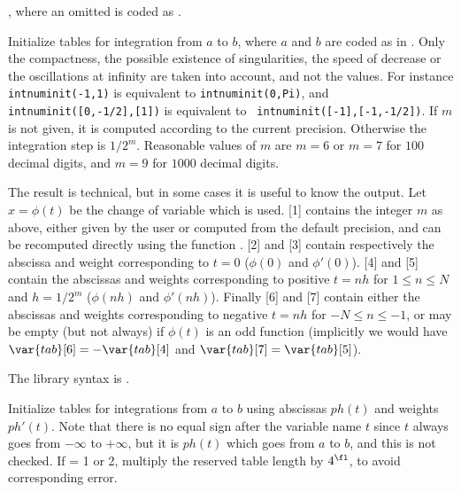 ,
where an omitted  is coded as .

\label{se:intnuminit}
Initialize tables for integration from
$a$ to $b$, where $a$ and $b$ are coded as in . Only the
compactness, the possible existence of singularities, the speed of decrease
or the oscillations at infinity are taken into account, and not the values.
For instance {\tt intnuminit(-1,1)} is equivalent to {\tt intnuminit(0,Pi)},
and {\tt intnuminit([0,-1/2],[1])} is equivalent to {\tt
intnuminit([-1],[-1,-1/2])}. If $m$ is not given, it is computed according to
the current precision. Otherwise the integration step is $1/2^m$. Reasonable
values of $m$ are $m=6$ or $m=7$ for $100$ decimal digits, and $m=9$ for
$1000$ decimal digits.

The result is technical, but in some cases it is useful to know the output.
Let $x=\phi(t)$ be the change of variable which is used. [1] contains
the integer $m$ as above, either given by the user or computed from the default
precision, and can be recomputed directly using the function .
[2] and [3] contain respectively the abscissa and weight
corresponding to $t=0$ ($\phi(0)$ and $\phi'(0)$). [4] and
[5] contain the abscissas and weights corresponding to positive
$t=nh$ for $1\le n\le N$ and $h=1/2^m$ ($\phi(nh)$ and $\phi'(nh)$). Finally
[6] and [7] contain either the abscissas and weights
corresponding to negative $t=nh$ for $-N\le n\le -1$, or may be empty (but
not always) if $\phi(t)$ is an odd function (implicitly we would have
$\var{tab}[6]=-\var{tab}[4]$ and $\var{tab}[7]=\var{tab}[5]$).

The library syntax is .

\label{se:intnuminitgen}
Initialize tables for integrations from $a$ to $b$ using abscissas
$ph(t)$ and weights $ph'(t)$. Note that there is no equal sign after the
variable name $t$ since $t$ always goes from $-\infty$ to $+\infty$, but it
is $ph(t)$ which goes from $a$ to $b$, and this is not checked. If \fl = 1
or 2, multiply the reserved table length by $4^{\fl}$, to avoid corresponding
error.


